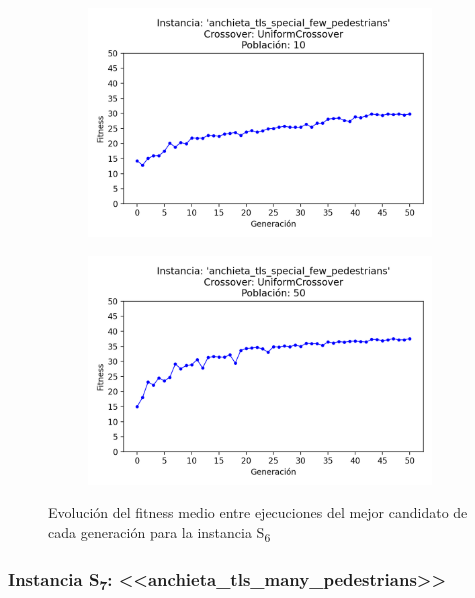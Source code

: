 \begin{figure}[h]
\begin{subfigure}[t]{.49\textwidth}
      \includegraphics[width=\textwidth]{report/images/estudio/anchieta_tls_special_few_pedestrians-UniformCrossover-10.png}
    \end{subfigure}
    \hfill
    \begin{subfigure}[t]{.49\textwidth}
      \centering
      \includegraphics[width=\textwidth]{report/images/estudio/anchieta_tls_special_few_pedestrians-UniformCrossover-50.png}
    \end{subfigure}
    \caption{Evolución del fitness medio entre ejecuciones del mejor candidato de cada generación para la instancia S\textsubscript{6}}
    \label{fig:estudio:anchieta_tls_special_few_pedestrians}
\end{figure}



\subsubsection{Instancia S\textsubscript{7}: <<anchieta\_tls\_many\_pedestrians>>}


